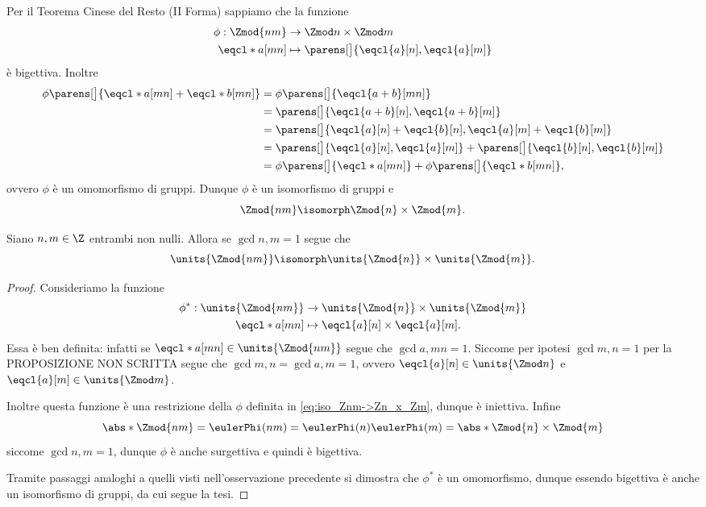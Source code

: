 \begin{remark}
    Per il Teorema Cinese del Resto (II Forma) sappiamo che la funzione 
    \begin{align} \label{eq:iso_Znm->Zn_x_Zm}
        \begin{split}
            \phi : \Zmod{nm} &\to \Zmod n \times \Zmod m\\
            \eqcl*{a}[mn] &\mapsto \parens[\big]{\eqcl{a}[n], \eqcl{a}[m]}
        \end{split}
    \end{align} è bigettiva. Inoltre \begin{align*}
        \phi\parens[\big]{\eqcl*{a}[mn] + \eqcl*{b}[mn]} &= \phi\parens[\big]{\eqcl{a+b}[mn]}\\
        &= \parens[\big]{\eqcl{a+b}[n], \eqcl{a+b}[m]}\\
        &= \parens[\big]{\eqcl{a}[n] + \eqcl{b}[n], \eqcl{a}[m] + \eqcl{b}[m]}\\
        &= \parens[\big]{\eqcl{a}[n], \eqcl{a}[m]} + \parens[\big]{\eqcl{b}[n], \eqcl{b}[m]}\\
        &= \phi\parens[\big]{\eqcl*{a}[mn]} + \phi\parens[\big]{\eqcl*{b}[mn]},
    \end{align*} ovvero $\phi$ è un omomorfismo di gruppi. Dunque $\phi$ è un isomorfismo di gruppi e \[
        \Zmod{nm} \isomorph \Zmod{n}\times \Zmod{m}.  
    \]
\end{remark}

\begin{corollary}
     Siano $n, m \in \Z$ entrambi non nulli. Allora se $\gcd{n, m} = 1$ segue che \begin{equation}
        \units{\Zmod{nm}} \isomorph \units{\Zmod{n}} \times \units{\Zmod{m}}.
    \end{equation}
\end{corollary}
\begin{proof}
    Consideriamo la funzione 
    \begin{align*}
        \phi^* : \units{\Zmod{nm}} &\to \units{\Zmod{n}} \times \units{\Zmod{m}}\\
        \eqcl*{a}[mn] &\mapsto \eqcl{a}[n] \times \eqcl{a}[m].
    \end{align*}
    Essa è ben definita: infatti se $\eqcl*{a}[mn] \in \units{\Zmod{nm}}$ segue che $\gcd{a, mn} = 1$. Siccome per ipotesi $\gcd{m, n} = 1$ per la PROPOSIZIONE NON SCRITTA segue che $\gcd{m, n} = \gcd{a, m} = 1$, ovvero $\eqcl{a}[n] \in \units{\Zmod n}$ e $\eqcl{a}[m] \in \units{\Zmod m}$.

    Inoltre questa funzione è una restrizione della $\phi$ definita in \eqref{eq:iso_Znm->Zn_x_Zm}, dunque è iniettiva. Infine \[
        \abs*{\Zmod{nm}} = \eulerPhi(nm) = \eulerPhi(n)\eulerPhi(m) = \abs*{\Zmod{n} \times \Zmod{m}}    
    \] siccome $\gcd{n, m} = 1$, dunque $\phi$ è anche surgettiva e quindi è bigettiva.

    Tramite passaggi analoghi a quelli visti nell'osservazione precedente si dimostra che $\phi^*$ è un omomorfismo, dunque essendo bigettiva è anche un isomorfismo di gruppi, da cui segue la tesi.
\end{proof}

